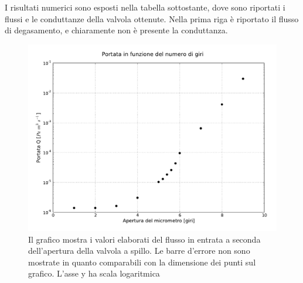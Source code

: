 I risultati numerici sono esposti nella tabella sottostante, dove sono riportati i flussi e le conduttanze della valvola ottenute.
Nella prima riga è riportato il flusso di degasamento, e chiaramente non è presente la conduttanza.



\begin{figure}[h!]
    \includegraphics[width=16cm]{graph.pdf}
    \caption{Il grafico mostra i valori elaborati del flusso in entrata a seconda dell'apertura della valvola a spillo. Le barre d'errore non sono
    mostrate in quanto comparabili con la dimensione dei punti sul grafico. L'asse y ha scala logaritmica}
    \label{fig:graph}
\end{figure}
